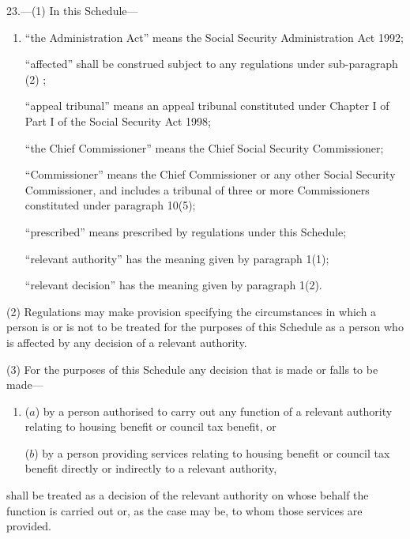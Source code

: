 \documentclass[12pt,a4paper]{article}
\begin{document}
23.---(1) In this Schedule—
\begin{enumerate}\item[]
    “the Administration Act” means the Social Security Administration Act 1992;

    “affected” shall be construed subject to any regulations under sub-paragraph (2) ;

    “appeal tribunal” means an appeal tribunal constituted under Chapter I of Part I of the Social Security Act 1998;

    “the Chief Commissioner” means the Chief Social Security Commissioner;

    “Commissioner” means the Chief Commissioner or any other Social Security Commissioner, and includes a tribunal of three or more Commissioners constituted under paragraph 10(5);

    “prescribed” means prescribed by regulations under this Schedule;

    “relevant authority” has the meaning given by paragraph 1(1);

    “relevant decision” has the meaning given by paragraph 1(2). 
\end{enumerate}

(2) Regulations may make provision specifying the circumstances in which a person is or is not to be treated for the purposes of this Schedule as a person who is affected by any decision of a relevant authority.

(3) For the purposes of this Schedule any decision that is made or falls to be made—
\begin{enumerate}\item[]
($a$) by a person authorised to carry out any function of a relevant authority relating to housing benefit or council tax benefit, or

($b$) by a person providing services relating to housing benefit or council tax benefit directly or indirectly to a relevant authority,
\end{enumerate}
shall be treated as a decision of the relevant authority on whose behalf the function is carried out or, as the case may be, to whom those services are provided. 

\end{document}
